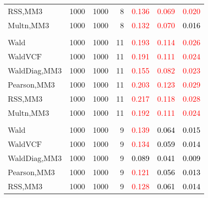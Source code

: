 \documentclass[
]{article}
\begin{document}
\begin{table}[H]
{\begin{tabular}[t]{lrrrrrr}
\hspace{1em}RSS,MM3 & 1000 & 1000 & 8 & \textcolor{red}{0.136} & \textcolor{red}{0.069} & \textcolor{red}{0.020}\\
\hspace{1em}Multn,MM3 & 1000 & 1000 & 8 & \textcolor{red}{0.132} & \textcolor{red}{0.070} & \textcolor{black}{0.016}\\
\addlinespace[0.3em]
\multicolumn{7}{l}{\textbf{1F 15V}}\\
\hspace{1em}Wald & 1000 & 1000 & 11 & \textcolor{red}{0.193} & \textcolor{red}{0.114} & \textcolor{red}{0.026}\\
\hspace{1em}WaldVCF & 1000 & 1000 & 11 & \textcolor{red}{0.191} & \textcolor{red}{0.111} & \textcolor{red}{0.024}\\
\hspace{1em}WaldDiag,MM3 & 1000 & 1000 & 11 & \textcolor{red}{0.155} & \textcolor{red}{0.082} & \textcolor{red}{0.023}\\
\hspace{1em}Pearson,MM3 & 1000 & 1000 & 11 & \textcolor{red}{0.203} & \textcolor{red}{0.123} & \textcolor{red}{0.029}\\
\hspace{1em}RSS,MM3 & 1000 & 1000 & 11 & \textcolor{red}{0.217} & \textcolor{red}{0.118} & \textcolor{red}{0.028}\\
\hspace{1em}Multn,MM3 & 1000 & 1000 & 11 & \textcolor{red}{0.192} & \textcolor{red}{0.111} & \textcolor{red}{0.024}\\
\addlinespace[0.3em]
\multicolumn{7}{l}{\textbf{2F 10V}}\\
\hspace{1em}Wald & 1000 & 1000 & 9 & \textcolor{red}{0.139} & \textcolor{black}{0.064} & \textcolor{black}{0.015}\\
\hspace{1em}WaldVCF & 1000 & 1000 & 9 & \textcolor{red}{0.134} & \textcolor{black}{0.059} & \textcolor{black}{0.014}\\
\hspace{1em}WaldDiag,MM3 & 1000 & 1000 & 9 & \textcolor{black}{0.089} & \textcolor{black}{0.041} & \textcolor{black}{0.009}\\
\hspace{1em}Pearson,MM3 & 1000 & 1000 & 9 & \textcolor{red}{0.121} & \textcolor{black}{0.056} & \textcolor{black}{0.013}\\
\hspace{1em}RSS,MM3 & 1000 & 1000 & 9 & \textcolor{red}{0.128} & \textcolor{black}{0.061} & \textcolor{black}{0.014}\\

\end{tabular}}
\end{table}
\end{document}

